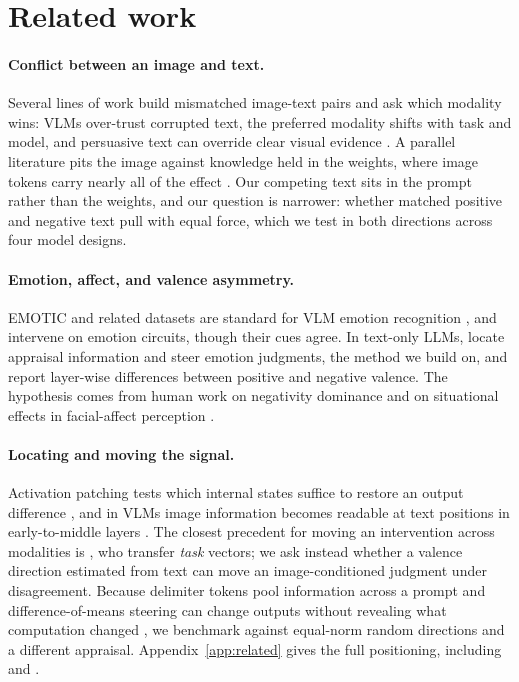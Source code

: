 \documentclass{article}
\newif\ifshort
\begin{document}
\ifshort\else
\section{Related work}
\label{sec:related}

\paragraph{Conflict between an image and text.}
Several lines of work build mismatched image-text pairs and ask which modality wins: VLMs over-trust corrupted text, the preferred modality shifts with task and model, and persuasive text can override clear visual evidence \citep{deng2025blindfaith, mixedsignals2025, contextvqa2026, signpost2026, camel2025}. A parallel literature pits the image against knowledge held in the weights, where image tokens carry nearly all of the effect \citep{nooralahzadeh2026, lietzow2026, seeingoverrides2026, unraveling2024}. Our competing text sits in the prompt rather than the weights, and our question is narrower: whether matched positive and negative text pull with equal force, which we test in both directions across four model designs.

\paragraph{Emotion, affect, and valence asymmetry.}
EMOTIC and related datasets are standard for VLM emotion recognition \citep{kosti2019, etesam2024, agarwal2026, mosear2025, emomm2026}, and \citet{veena2026} intervene on emotion circuits, though their cues agree. In text-only LLMs, \citet{tak2025} locate appraisal information and steer emotion judgments, the method we build on, and \citet{negbeforepos2026} report layer-wise differences between positive and negative valence. The hypothesis comes from human work on negativity dominance \citep{rozin2001, baumeister2001} and on situational effects in facial-affect perception \citep{aviezer2008, aviezer2012}.

\paragraph{Locating and moving the signal.}
Activation patching tests which internal states suffice to restore an output difference \citep{meng2022, patchingbestpractices, attributionpatching}, and in VLMs image information becomes readable at text positions in early-to-middle layers \citep{basu2024, whatsintheimage2025, narrowgate2024, towardsinterp2024, fcct2026}. The closest precedent for moving an intervention across modalities is \citet{luo2025}, who transfer \emph{task} vectors; we ask instead whether a valence direction estimated from text can move an image-conditioned judgment under disagreement. Because delimiter tokens pool information across a prompt \citep{xiao2024, activedormant2024, zhang2026anydepth} and difference-of-means steering can change outputs without revealing what computation changed \citep{steeringunreliability2025, steeringnonident2026}, we benchmark against equal-norm random directions and a different appraisal. Appendix~\ref{app:related} gives the full positioning, including \citet{nikankin2025} and \citet{conflictchallenges2025}.
\fi
\end{document}
